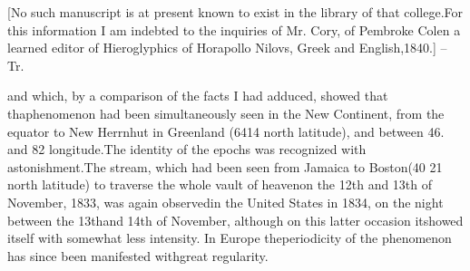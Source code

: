 {[No such manuscript is at present known to exist in the library of that college.For this information I am indebted to the inquiries of Mr. Cory, of Pembroke Colen a learned editor of Hieroglyphics of Horapollo Nilovs, Greek and English,1840.] -- Tr.

} and which, by a comparison of the facts I had adduced, showed that thaphenomenon had been simultaneously seen in the New Continent, from the equator to New Herrnhut in Greenland (6414 north latitude), and between 46. and 82 longitude.The identity of the epochs was recognized with astonishment.The stream, which had been seen from Jamaica to Boston(40 21 north latitude) to traverse the whole vault of heavenon the 12th and 13th of November, 1833, was again observedin the United States in 1834, on the night between the 13thand 14th of November, although on this latter occasion itshowed itself with somewhat less intensity. In Europe theperiodicity of the phenomenon has since been manifested withgreat regularity.

